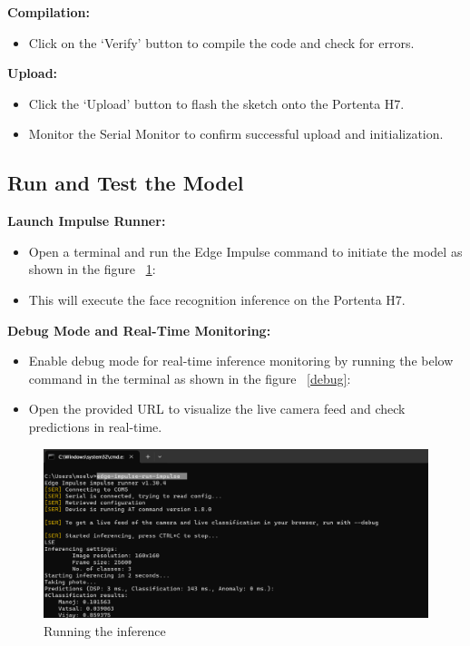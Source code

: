 \textbf{Compilation:}  
\begin{itemize}[leftmargin=1.5cm]
	\item Click on the ‘Verify’ button to compile the code and check for errors.
\end{itemize}

\textbf{Upload:}  
\begin{itemize}[leftmargin=1.5cm]
	\item Click the ‘Upload’ button to flash the sketch onto the Portenta H7.
	\item Monitor the Serial Monitor to confirm successful upload and initialization.
\end{itemize}

\subsection{Run and Test the Model}

\textbf{Launch Impulse Runner:}  
\begin{itemize}[leftmargin=1.5cm]
	\item Open a terminal and run the Edge Impulse command to initiate the model as shown in the figure ~\ref{inference}:  
	 \\   
	\item This will execute the face recognition inference on the Portenta H7.
\end{itemize}

\textbf{Debug Mode and Real-Time Monitoring:}  
\begin{itemize}[leftmargin=1.5cm]
	\item Enable debug mode for real-time inference monitoring by running the below command in the terminal as shown in the figure ~\ref{debug}:
	\\  
	\item Open the provided URL to visualize the live camera feed and check predictions in real-time.
\end{itemize}

\begin{figure}
	\begin{center}
		\includegraphics[width=0.7\linewidth]{Images/EdgeImpulse/run_impulse.png}
		\caption{Running the inference}
		\label{inference}
	\end{center}
\end{figure}

